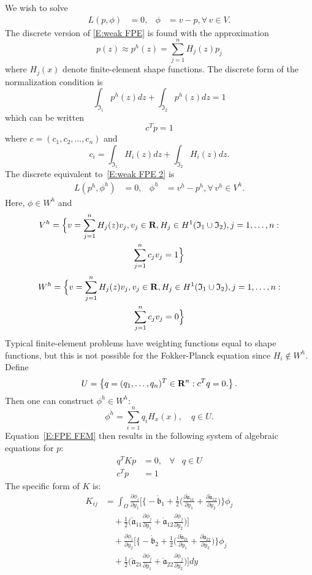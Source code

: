 We wish to solve
\begin{align}
\label{E:weak FPE 2}
L(p,\phi) &= 0, & \phi &= v - p, \forall \, v \in V.
\end{align}
The discrete version of \eqref{E:weak FPE} is found with the approximation
\[
p(z) \approx p^h(z) = \sum_{j=1}^n H_j(z) p_j
\]
where $H_j(x)$ denote finite-element shape functions. The discrete form of the normalization condition is
\[
\int_{\mathfrak I_1} p^h(z) dz + \int_{\mathfrak I_2} p^h(z) dz = 1
\]
which can be written
\[
c^T p = 1
\]
where $c = (c_1, c_2, \dots, c_n)$ and
\[
c_i = \int_{\mathfrak I_1} H_i(z) dz + \int_{\mathfrak I_2} H_i(z) dz.
\]
The discrete equivalent to~\eqref{E:weak FPE 2} is
\begin{align}
L(p^h,\phi^h) &= 0, & \phi^h &= v^h - p^h, \forall \, v^h \in V^h.
\label{E:FPE FEM}
\end{align}
Here, $\phi \in W^h$ and
\begin{multline*}
V^h = \Big\{v = \sum_{j=1}^n H_j(z) v_j, v_j \in \mathbf R, H_j \in H^1(\mathfrak I_1 \cup \mathfrak I_2), j = 1,\dots,n:\\
\sum_{j=1}^n c_j v_j = 1\Big\}
\end{multline*}
\begin{multline*}
W^h = \Big\{v = \sum_{j=1}^n H_j(z) v_j, v_j \in \mathbf R, H_j \in H^1(\mathfrak I_1 \cup \mathfrak I_2), j = 1,\dots,n:\\
\sum_{j=1}^n c_j v_j = 0\Big\}
\end{multline*}
Typical finite-element problems have weighting functions equal to shape functions, but this is not possible for the Fokker-Planck equation since $H_i \notin W^h$. Define
\[
U = \left\{q = (q_1,\dots,q_n)^T \in \mathbf R^n: c^T q = 0.\right\}.
\]
Then one can construct $\phi^h \in W^h$:
\[
\phi^h = \sum_{i=1}^n q_i H_x(x), \quad q \in U.
\]
Equation~\eqref{E:FPE FEM} then results in the following system of algebraic equations for $p$:
\begin{align*}
q^T K p &= 0, & \forall& q \in U\\
c^T p &= 1
\end{align*}
The specific form of $K$ is:
\begin{align*}
K_{ij} &= \int_\Omega \frac{\partial \phi_i}{\partial y_1} \Big[\Big\{-\mathring{\mathfrak b}_1 + \frac12 \Big(\frac{\partial \mathring{\mathfrak a}_{11}}{\partial y_1} + \frac{\partial \mathring{\mathfrak a}_{12}}{\partial y_2}\Big)\Big\}\phi_j\\
&\quad + \frac12 \Big(\mathring{\mathfrak a}_{11}\frac{\partial \phi_j}{\partial y_1} +
\mathring{\mathfrak a}_{12} \frac{\partial \phi_j}{\partial y_2} \Big) \Big] \\
&\quad + \frac{\partial \phi_i}{\partial y_2} \Big[\Big\{-\mathring{\mathfrak b}_2 + \frac12 \Big(\frac{\partial \mathring{\mathfrak a}_{21}}{\partial y_1} + \frac{\partial
\mathring{\mathfrak a}_{22}}{\partial y_2}\Big)\Big\}\phi_j\\
&\quad + \frac12 \Big(\mathring{\mathfrak a}_{21} \frac{\partial \phi_j}{\partial y_1} +
\mathring{\mathfrak a}_{22} \frac{\partial \phi_j}{\partial y_2} \Big) \Big] dy
\end{align*}

